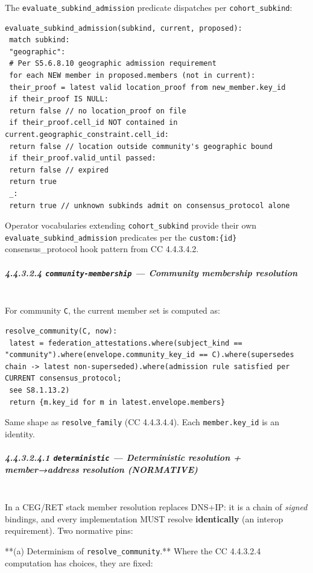 \documentclass[11pt]{article}
\begin{document}
The \texttt{evaluate\_subkind\_admission} predicate dispatches per \texttt{cohort\_subkind}:


\begin{lstlisting}
evaluate_subkind_admission(subkind, current, proposed):
 match subkind:
 "geographic":
 # Per S5.6.8.10 geographic admission requirement
 for each NEW member in proposed.members (not in current):
 their_proof = latest valid location_proof from new_member.key_id
 if their_proof IS NULL:
 return false // no location_proof on file
 if their_proof.cell_id NOT contained in current.geographic_constraint.cell_id:
 return false // location outside community's geographic bound
 if their_proof.valid_until passed:
 return false // expired
 return true
 _:
 return true // unknown subkinds admit on consensus_protocol alone
\end{lstlisting}

Operator vocabularies extending \texttt{cohort\_subkind} provide their own \texttt{evaluate\_subkind\_admission} predicates per the \texttt{custom:\{id\}} consensus\_protocol hook pattern from CC 4.4.3.4.2.


\subparagraph{4.4.3.2.4 \texttt{community-membership} — Community membership resolution}\mbox{}\\


For community \texttt{C}, the current member set is computed as:


\begin{lstlisting}
resolve_community(C, now):
 latest = federation_attestations.where(subject_kind == "community").where(envelope.community_key_id == C).where(supersedes chain -> latest non-superseded).where(admission rule satisfied per CURRENT consensus_protocol;
 see S8.1.13.2)
 return {m.key_id for m in latest.envelope.members}
\end{lstlisting}

Same shape as \texttt{resolve\_family} (CC 4.4.3.4.4). Each \texttt{member.key\_id} is an identity.


\subparagraph{4.4.3.2.4.1 \texttt{deterministic} — Deterministic resolution + member→address resolution (NORMATIVE)}\mbox{}\\


In a CEG/RET stack member resolution replaces DNS+IP: it is a chain of \textit{signed} bindings, and every implementation MUST resolve \textbf{identically} (an interop requirement). Two normative pins:


**(a) Determinism of \texttt{resolve\_community}.** Where the CC 4.4.3.2.4 computation has choices, they are fixed:
\end{document}
